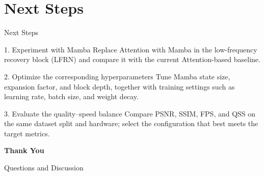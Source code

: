 \documentclass[aspectratio=169,10pt]{beamer}
\begin{document}
\section{Next Steps}
\begin{frame}{Next Steps}
  \begin{block}{1. Experiment with Mamba}
    Replace Attention with Mamba in the low-frequency recovery block (LFRN)
    and compare it with the current Attention-based baseline.
  \end{block}
  \vspace{0.15cm}
  \begin{block}{2. Optimize the corresponding hyperparameters}
    Tune Mamba state size, expansion factor, and block depth, together with
    training settings such as learning rate, batch size, and weight decay.
  \end{block}
  \vspace{0.15cm}
  \begin{block}{3. Evaluate the quality--speed balance}
    Compare PSNR, SSIM, FPS, and QSS on the same dataset split and hardware;
    select the configuration that best meets the target metrics.
  \end{block}
\end{frame}

\begin{frame}[c]
  \centering
  {\fontsize{28pt}{34pt}\selectfont\bfseries\color{uetblue}Thank You\par}
  \vspace{0.35cm}
  {\large\color{uetdarkgreen}Questions and Discussion\par}
\end{frame}
\end{document}
